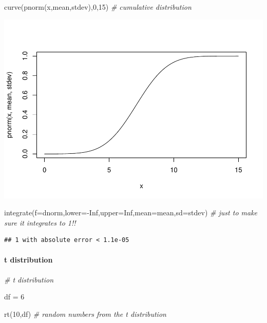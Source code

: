 \documentclass[
]{article}
\newenvironment{Shaded}{\begin{snugshade}}{\end{snugshade}}
\newcommand{\AttributeTok}[1]{\textcolor[rgb]{0.77,0.63,0.00}{#1}}
\newcommand{\CommentTok}[1]{\textcolor[rgb]{0.56,0.35,0.01}{\textit{#1}}}
\newcommand{\ConstantTok}[1]{\textcolor[rgb]{0.00,0.00,0.00}{#1}}
\newcommand{\DecValTok}[1]{\textcolor[rgb]{0.00,0.00,0.81}{#1}}
\newcommand{\FunctionTok}[1]{\textcolor[rgb]{0.00,0.00,0.00}{#1}}
\newcommand{\NormalTok}[1]{#1}
\newcommand{\OtherTok}[1]{\textcolor[rgb]{0.56,0.35,0.01}{#1}}
\newcommand{\SpecialCharTok}[1]{\textcolor[rgb]{0.00,0.00,0.00}{#1}}
\begin{document}
\begin{Shaded}
\begin{Highlighting}[]
\FunctionTok{curve}\NormalTok{(}\FunctionTok{pnorm}\NormalTok{(x,mean,stdev),}\DecValTok{0}\NormalTok{,}\DecValTok{15}\NormalTok{)   }\CommentTok{\# cumulative distribution}
\end{Highlighting}
\end{Shaded}

\includegraphics{LECTURE2_files/figure-latex/unnamed-chunk-21-2.pdf}

\begin{Shaded}
\begin{Highlighting}[]
\FunctionTok{integrate}\NormalTok{(}\AttributeTok{f=}\NormalTok{dnorm,}\AttributeTok{lower=}\SpecialCharTok{{-}}\ConstantTok{Inf}\NormalTok{,}\AttributeTok{upper=}\ConstantTok{Inf}\NormalTok{,}\AttributeTok{mean=}\NormalTok{mean,}\AttributeTok{sd=}\NormalTok{stdev)    }\CommentTok{\# just to make sure it integrates to 1!!}
\end{Highlighting}
\end{Shaded}

\begin{verbatim}
## 1 with absolute error < 1.1e-05
\end{verbatim}

\hypertarget{t-distribution}{%
\paragraph{t distribution}\label{t-distribution}}

\begin{Shaded}
\begin{Highlighting}[]
\CommentTok{\# t distribution}

\NormalTok{df }\OtherTok{=} \DecValTok{6}

\FunctionTok{rt}\NormalTok{(}\DecValTok{10}\NormalTok{,df)     }\CommentTok{\# random numbers from the t distribution}
\end{Highlighting}
\end{Shaded}
\end{document}
